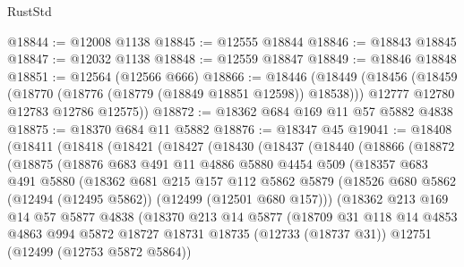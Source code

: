 \begin{lexlean}{RustStd}
\begin{coremodule}
@18844 := @12008 @1138
@18845 := @12555 @18844
@18846 := @18843 @18845
@18847 := @12032 @1138
@18848 := @12559 @18847
@18849 := @18846 @18848
@18851 := @12564 (@12566 @666)
@18866 := @18446
    (@18449
      (@18456
        (@18459 (@18770 (@18776 (@18779 (@18849 @18851 @12598)) @18538)))
        @12777
        @12780
        @12783
        @12786
        @12575))
@18872 := @18362 @684 @169 @11 @57 @5882 @4838
@18875 := @18370 @684 @11 @5882
@18876 := @18347 @45
@19041 := @18408
    (@18411
      (@18418
        (@18421
          (@18427
            (@18430
              (@18437
                (@18440
                  (@18866
                    (@18872
                      (@18875
                        (@18876
                          @683
                          @491
                          @11
                          @4886
                          @5880
                          @4454
                          @509
                          (@18357
                            @683
                            @491
                            @5880
                            (@18362
                              @681
                              @215
                              @157
                              @112
                              @5862
                              @5879
                              (@18526
                                @680
                                @5862
                                (@12494 (@12495 @5862))
                                (@12499 (@12501 @680 @157)))
                              (@18362
                                @213
                                @169
                                @14
                                @57
                                @5877
                                @4838
                                (@18370
                                  @213
                                  @14
                                  @5877
                                  (@18709
                                    @31
                                    @118
                                    @14
                                    @4853
                                    @4863
                                    @994
                                    @5872
                                    @18727
                                    @18731
                                    @18735
                                    (@12733 (@18737 @31))
                                    @12751
                                    (@12499 (@12753 @5872 @5864))

\end{coremodule}
\end{lexlean}
